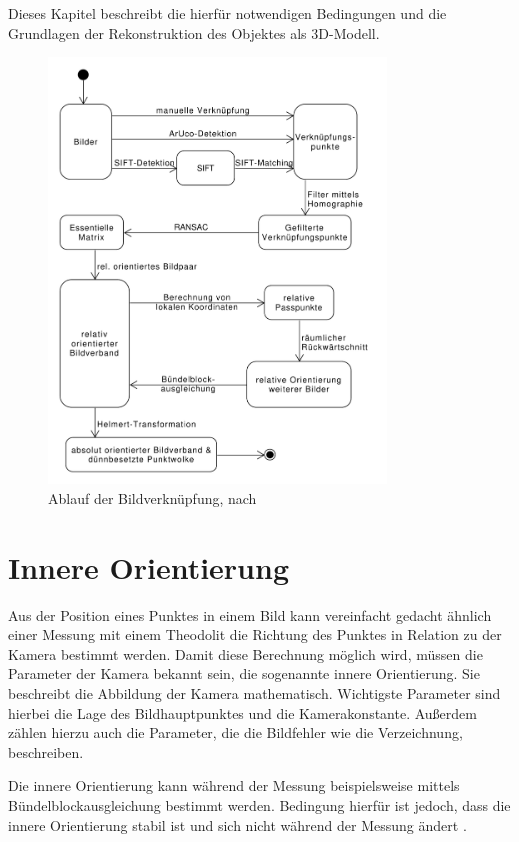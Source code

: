 \documentclass[a4paper,12pt,bibliography=totoc, listof=totoc,titlepage]{scrreprt}
\begin{document}
Dieses Kapitel beschreibt die hierfür notwendigen Bedingungen und die Grundlagen der Rekonstruktion des Objektes als 3D-Modell.

\begin{figure}
    \centering
    \includegraphics[width=0.8\textwidth]{./img/Ablauf.pdf}
    \centering
    \caption{Ablauf der Bildverknüpfung, nach \citealt[S. 492]{luhmann}} %
    \label{img:ablauf} %
\end{figure}

\section{Innere Orientierung}
\label{s:innereorientierung}
Aus der Position eines Punktes in einem Bild kann vereinfacht gedacht ähnlich einer Messung mit einem Theodolit die Richtung des Punktes in Relation zu der Kamera bestimmt werden. Damit diese Berechnung möglich wird, müssen die Parameter der Kamera bekannt sein, die sogenannte innere Orientierung. Sie beschreibt die Abbildung der Kamera mathematisch. Wichtigste Parameter sind hierbei die Lage des Bildhauptpunktes und die Kamerakonstante. Außerdem zählen hierzu auch die Parameter, die die Bildfehler wie die Verzeichnung, beschreiben. \citep[S. 179f]{luhmann}

Die innere Orientierung kann während der Messung beispielsweise mittels Bündel\-block\-ausgleichung bestimmt werden. Bedingung hierfür ist jedoch, dass die innere Orientierung stabil ist und sich nicht während der Messung ändert \citep[S. 181f]{luhmann}.
\end{document}
